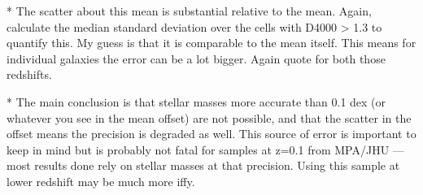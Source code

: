  * The scatter about this mean is substantial relative to
 the mean. Again, calculate the median standard deviation
 over the cells with D4000 > 1.3 to quantify this. My guess
 is that it is  comparable to the mean itself. This means
 for individual galaxies the error can be a lot bigger.
 Again quote for both those redshifts.

 * The main conclusion is that stellar masses more accurate
than 0.1 dex (or whatever you see in the mean offset) are
not possible, and that the scatter in the offset means the
precision is degraded as well. This source of error is important
to keep in mind but is probably not fatal for samples at z=0.1
from MPA/JHU --- most results done rely on stellar masses
at that precision. Using this sample at lower redshift may be
much more iffy.







